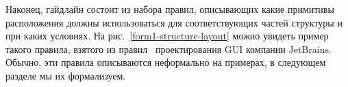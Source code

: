 
Наконец, гайдлайн состоит из набора правил, описывающих какие примитивы расположения должны использоваться для
соответствующих частей структуры и при каких условиях. На рис.~\ref{form1-structure-layout}
можно увидеть пример такого правила, взятого из правил~\cite{JBG} проектирования GUI компании JetBrains.
Обычно, эти правила описываются неформально на примерах, в следующем разделе мы их формализуем.



